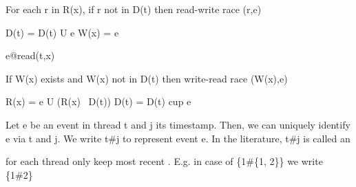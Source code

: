 \documentclass[landscape, a4paper]{article}
\begin{document}
\begin{minipage}[t]{0.195\linewidth}
\begin{betterlist}
{\begin{dnumberedcodebox}[minted language=text,minted options={autogobble, fontsize=\Large}, box align=top]
{                    For each r in R(x),
                    if r not in D(t)
                    then read-write race  (r,e)

                    D(t) = D(t) U { e }
                    W(x) = e
                  }
                  e@read(t,x) {
                    If W(x) exists and W(x) 
                      not in D(t)
                    then write-read race (W(x),e)

                    R(x) = {e} U (R(x) \ D(t))
                    D(t) = D(t) cup { e }
                  }
                  \end{dnumberedcodebox}
		}
	\end{betterlist}
	\begin{betterlist}
		\item Let e be an event in thread t and j its timestamp. Then, we can uniquely identify e via t and j. We write t\#j to represent event e. In the literature, t\#j is called an 
		\begin{betterlist}
			\item for each thread only keep most recent . E.g. in case of \{1\#\{1, 2\}\} we write \{1\#2\}
		\end{betterlist}
	\end{betterlist}
\end{minipage}
\end{document}
